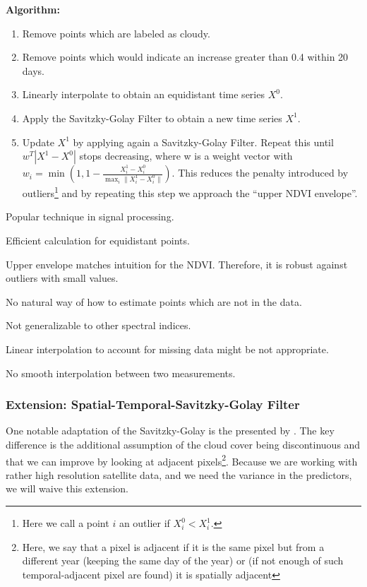 \textbf{Algorithm:}
\begin{enumerate}
  \item Remove points which are labeled as cloudy.
  \item Remove points which would indicate an increase greater than 0.4 within 20 days.
  \item Linearly interpolate to obtain an equidistant time series $X^0$.
  \item Apply the Savitzky-Golay Filter to obtain a new time series $X^1$.
  \item Update $X^1$ by applying again a Savitzky-Golay Filter. Repeat this until $w^T |X^1-X^0|$ stops decreasing, where w is a weight vector with $w_i = \min\left(1, 1 - \frac{X^1_i-X^0_i}{\max_i\|X^1_i-X^0_i\|}\right)$. This reduces the penalty introduced by outliers\footnote{Here we call a point $i$ an outlier if $X^0_i<X^1_i$.} and by repeating this step we approach the ``upper NDVI envelope''.
\end{enumerate}

\begin{my_pros_cons_table}{
    \item Popular technique in signal processing.
    \item Efficient calculation for equidistant points.
    \item Upper envelope matches intuition for the NDVI. Therefore, it is robust against outliers with small values.
  }{
    \item No natural way of how to estimate points which are not in the data.
    \item Not generalizable to other spectral indices.
    \item Linear interpolation to account for missing data might be not appropriate.
    \item No smooth interpolation between two measurements.
  }
\end{my_pros_cons_table}


\subsubsection*{Extension: Spatial-Temporal-Savitzky-Golay Filter}
One notable adaptation of the Savitzky-Golay is the presented by \cite{caoSimpleMethodImprove2018b}. The key difference is the additional assumption of the cloud cover being discontinuous and that we can improve by looking at adjacent pixels\footnote{Here, we say that a pixel is adjacent if it is the same pixel but from a different year (keeping the same day of the year) or (if not enough of such temporal-adjacent pixel are found) it is spatially adjacent}. Because we are working with rather high resolution satellite data, and we need the variance in the predictors, we will waive this extension.


